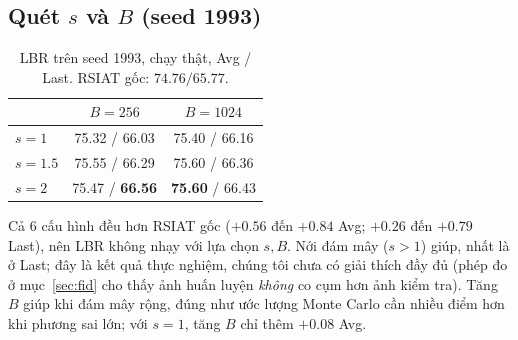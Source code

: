 \documentclass[11pt]{article}
\begin{document}
\subsection{Quét $s$ và $B$ (seed 1993)}\label{sec:grid}
\begin{table}[H]
\centering\small
\caption{LBR trên seed 1993, chạy thật, Avg / Last. RSIAT gốc: $74.76 / 65.77$.}
\label{tab:grid}
\begin{tabular}{lcc}
\toprule
& $B=256$ & $B=1024$\\
\midrule
$s=1$ & 75.32 / 66.03 & 75.40 / 66.16\\
$s=1.5$ & 75.55 / 66.29 & 75.60 / 66.36\\
$s=2$ & 75.47 / \textbf{66.56} & \textbf{75.60} / 66.43\\
\bottomrule
\end{tabular}
\end{table}
Cả 6 cấu hình đều hơn RSIAT gốc ($+0.56$ đến $+0.84$ Avg; $+0.26$ đến $+0.79$ Last), nên LBR không nhạy với lựa chọn
$s,B$. Nới đám mây ($s>1$) giúp, nhất là ở Last; đây là kết quả thực nghiệm, chúng tôi chưa có giải thích đầy đủ (phép
đo ở mục~\ref{sec:fid} cho thấy ảnh huấn luyện \emph{không} co cụm hơn ảnh kiểm tra). Tăng $B$ giúp khi đám mây rộng,
đúng như ước lượng Monte Carlo cần nhiều điểm hơn khi phương sai lớn; với $s=1$, tăng $B$ chỉ thêm $+0.08$ Avg.
\end{document}
